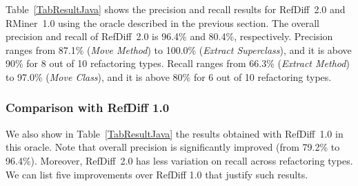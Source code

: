 Table~\ref{TabResultJava} shows the precision and recall results for RefDiff~2.0 and RMiner~1.0 using the oracle described in the previous section. The overall precision and recall of RefDiff~2.0 is 96.4\% and 80.4\%, respectively.
Precision ranges from 87.1\% (\emph{Move Method}) to 100.0\% (\emph{Extract Superclass}), and it is above 90\% for 8 out of 10 refactoring types.
Recall ranges from 66.3\% (\emph{Extract Method}) to 97.0\% (\emph{Move Class}), and it is above 80\% for 6 out of 10 refactoring types.

\subsubsection{Comparison with RefDiff 1.0}

We also show in Table~\ref{TabResultJava} the results obtained with RefDiff~1.0 in this oracle. Note that overall precision is significantly improved (from 79.2\% to 96.4\%). Moreover, RefDiff~2.0 has less variation on recall across refactoring types.
We can list five improvements over RefDiff 1.0 that justify such results.
